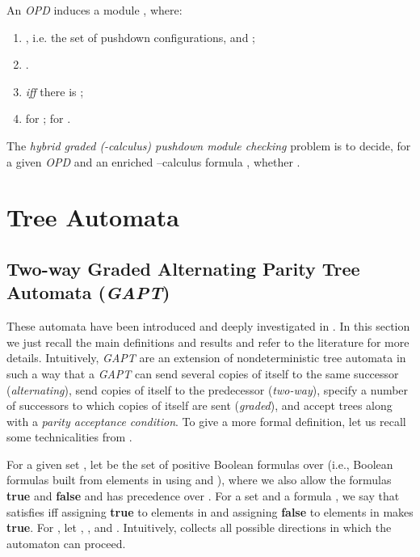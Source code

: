 \documentclass{LMCS}
\theoremstyle{plain}
\def \OPD           {\emph{OPD}\xspace}
\def \TGAPT         {\emph{GAPT}\xspace}
\begin{document}
An \OPD  induces a module , where:
\begin{enumerate}[]
\item
, i.e. the set of pushdown configurations,
and ;

\item
.

\item

\emph{iff} there is ;

\item
 for ;
 for .
\end{enumerate}
The \emph{hybrid graded (-calculus) pushdown module checking}
problem is to decide, for a given \OPD  and an enriched
--calculus formula , whether .

\section{Tree Automata}\label{sec:TreeAutomata}
\subsection{Two-way Graded Alternating Parity Tree Automata (\TGAPT)}\label{sub:Tgapt}
These automata have been introduced and deeply investigated in \cite{BLMV06}.
In this section we just recall the main definitions and results and refer to
the literature for more details. Intuitively, \TGAPT are an extension of
nondeterministic tree automata in such a way that a \TGAPT can send several
copies of itself to the same successor (\emph{alternating}), send copies of
itself to the predecessor (\emph{two-way}), specify a number  of successors
to which copies of itself are sent (\emph{graded}), and accept trees along with
a \emph{parity acceptance condition}. To give a more formal definition, let us
recall some technicalities from \cite{BLMV06}.

For a given set , let  be the set of positive Boolean formulas
over  (i.e., Boolean formulas built from elements in  using  and
), where we also allow the formulas \textbf{true} and \textbf{false} and
 has precedence over . For a set  and a formula
, we say that  satisfies  iff assigning
\textbf{true} to elements in  and assigning \textbf{false} to elements in  makes  \textbf{true}.  For , let , , and . Intuitively,  collects
all possible directions in which the automaton can proceed.
\end{document}
